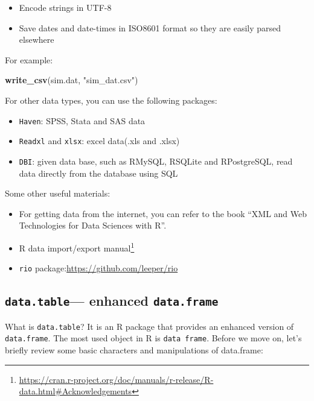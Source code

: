 \documentclass[12pt,]{krantz}
\makeatletter
\newenvironment{Shaded}{\begin{snugshade}}{\end{snugshade}}
\newcommand{\KeywordTok}[1]{\textcolor[rgb]{0.27,0.27,0.27}{\textbf{#1}}}
\newcommand{\NormalTok}[1]{#1}
\newcommand{\StringTok}[1]{\textcolor[rgb]{0.5,0.5,0.5}{#1}}
\providecommand{\tightlist}{%
  \setlength{\itemsep}{0pt}\setlength{\parskip}{0pt}}
\renewcommand{\href}[2]{#2\footnote{\url{#1}}}
\newenvironment{kframe}{%
\medskip{}
\setlength{\fboxsep}{.8em}
 \def\at@end@of@kframe{}%
 \ifinner\ifhmode%
  \def\at@end@of@kframe{\end{minipage}}%
  \begin{minipage}{\columnwidth}%
 \fi\fi%
 \def\FrameCommand##1{\hskip\@totalleftmargin \hskip-\fboxsep
 \colorbox{shadecolor}{##1}\hskip-\fboxsep
     \hskip-\linewidth \hskip-\@totalleftmargin \hskip\columnwidth}%
 \MakeFramed {\advance\hsize-\width
   \@totalleftmargin\z@ \linewidth\hsize
   \@setminipage}}%
 {\par\unskip\endMakeFramed%
 \at@end@of@kframe}
\renewenvironment{Shaded}{\begin{kframe}}{\end{kframe}}
\makeatother
\begin{document}
\begin{itemize}
\tightlist
\item
  Encode strings in UTF-8
\item
  Save dates and date-times in ISO8601 format so they are easily parsed elsewhere
\end{itemize}

For example:

\begin{Shaded}
\begin{Highlighting}[]
\KeywordTok{write_csv}\NormalTok{(sim.dat, }\StringTok{"sim_dat.csv"}\NormalTok{)}
\end{Highlighting}
\end{Shaded}

For other data types, you can use the following packages:

\begin{itemize}
\tightlist
\item
  \texttt{Haven}: SPSS, Stata and SAS data
\item
  \texttt{Readxl} and \texttt{xlsx}: excel data(.xls and .xlsx)
\item
  \texttt{DBI}: given data base, such as RMySQL, RSQLite and RPostgreSQL, read data directly from the database using SQL
\end{itemize}

Some other useful materials:

\begin{itemize}
\tightlist
\item
  For getting data from the internet, you can refer to the book ``XML and Web Technologies for Data Sciences with R''.\\
\item
  \href{https://cran.r-project.org/doc/manuals/r-release/R-data.html\#Acknowledgements}{R data import/export manual}
\item
  \texttt{rio} package:\url{https://github.com/leeper/rio}
\end{itemize}

\hypertarget{data.table-enhanced-data.frame}{%
\subsection{\texorpdfstring{\texttt{data.table}--- enhanced \texttt{data.frame}}{data.table--- enhanced data.frame}}\label{data.table-enhanced-data.frame}}

What is \texttt{data.table}? It is an R package that provides an enhanced version of \texttt{data.frame}. The most used object in R is \texttt{data\ frame}. Before we move on, let's briefly review some basic characters and manipulations of data.frame:
\end{document}
